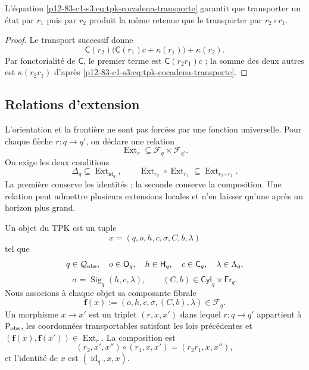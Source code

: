 {\begin{lemma}
\label{p12-83-c1-s3:lem:tpk-asociatividad-acarreo}
L’équation \cref{p12-83-c1-s3:eq:tpk-cocadena-transporte} garantit que transporter un
état par \(r_1\) puis par \(r_2\) produit la même retenue que
le transporter par \(r_2\circ r_1\).
\end{lemma}

\begin{proof}
Le transport successif donne
\[
 \mathsf C(r_2)\bigl(\mathsf C(r_1)c+\kappa(r_1)\bigr)+\kappa(r_2).
\]
Par fonctorialité de \(\mathsf C\), le premier terme est
\(\mathsf C(r_2r_1)c\) ; la somme des deux autres est
\(\kappa(r_2r_1)\) d’après \cref{p12-83-c1-s3:eq:tpk-cocadena-transporte}.
\end{proof}

\subsection{Relations d’extension}

L’orientation et la frontière ne sont pas forcées par une fonction universelle.
Pour chaque flèche \(r:q\to q'\), on déclare une relation
\[
 \operatorname{Ext}_r\subseteq\mathcal F_q\times\mathcal F_{q'}.
\]
On exige les deux conditions
\[
 \Delta_q\subseteq\operatorname{Ext}_{\operatorname{id}_q},
 \qquad
 \operatorname{Ext}_{r_2}\circ\operatorname{Ext}_{r_1}
 \subseteq\operatorname{Ext}_{r_2\circ r_1}.
\]
La première conserve les identités ; la seconde conserve la composition. Une
relation peut admettre plusieurs extensions locales et n’en laisser qu’une après un
horizon plus grand.

\begin{definition}
\label{p12-83-c1-s3:def:tpk-categoria-autonoma}
Un objet du TPK est un tuple
\[
 x=(q,o,h,c,\sigma,C,b,\lambda)
\]
tel que
\[
 q\in\mathcal Q_{\rm obs},\quad
 o\in\mathsf O_q,\quad
 h\in\mathsf H_q,\quad
 c\in\mathsf C_q,\quad
 \lambda\in\Lambda_q,
\]
\[
 \sigma=\operatorname{Sig}_q(h,c,\lambda),
 \qquad
 (C,b)\in\mathsf{Cyl}_q\times\mathsf{Fr}_q.
\]
Nous associons à chaque objet sa composante fibrale
\[
 \mathbf f(x):=(o,h,c,\sigma,(C,b),\lambda)\in\mathcal F_q.
\]
Un morphisme \(x\to x'\) est un triplet \((r,x,x')\) dans lequel
\(r:q\to q'\) appartient à \(\mathsf P_{\rm obs}\), les coordonnées
transportables satisfont les lois précédentes et
\((\mathbf f(x),\mathbf f(x'))\in
\operatorname{Ext}_r\). La composition est
\[
 (r_2,x',x'')\circ(r_1,x,x')=(r_2r_1,x,x''),
\]
et l’identité de \(x\) est \((\operatorname{id}_q,x,x)\).
\end{definition}

}
